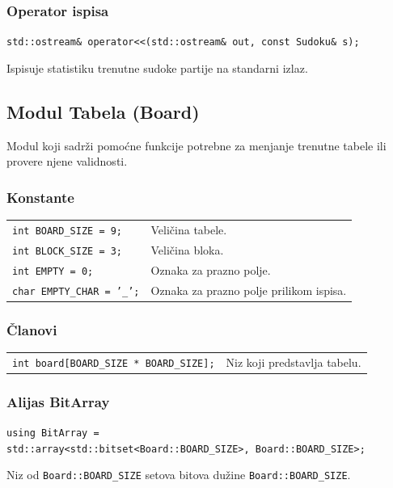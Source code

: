 \documentclass[a4paper]{article}
\begin{document}
    \subsubsection{Operator ispisa}
    {\parindent0pt
    \texttt{std::ostream\& operator<<(std::ostream\& out, const Sudoku\& s);}
    }
    \par Ispisuje statistiku trenutne sudoke partije na standarni izlaz.

    \subsection{Modul Tabela (Board)}
    Modul koji sadrži pomoćne funkcije potrebne za menjanje trenutne tabele ili provere njene validnosti.
    \subsubsection{Konstante}
    \begin{tabular}{ l l }
        \par\texttt{int BOARD\_SIZE = 9;} & Veličina tabele. \\
        \par\texttt{int BLOCK\_SIZE = 3;} & Veličina bloka. \\
        \par\texttt{int EMPTY = 0;}  & Oznaka za prazno polje. \\
        \par\texttt{char EMPTY\_CHAR = '\_';}  & Oznaka za prazno polje prilikom ispisa.
    \end{tabular}
    
    \subsubsection{Članovi}
    \begin{tabular}{ l l }
        \par\texttt{int board[BOARD\_SIZE * BOARD\_SIZE];} & Niz koji predstavlja tabelu.\\
    \end{tabular}

    \subsubsection{Alijas BitArray}
    \texttt{using BitArray = }\\
    \texttt{std::array<std::bitset<Board::BOARD\_SIZE>, Board::BOARD\_SIZE>;}
    \par Niz od \texttt{Board::BOARD\_SIZE} setova bitova dužine \texttt{Board::BOARD\_SIZE}.
\end{document}
